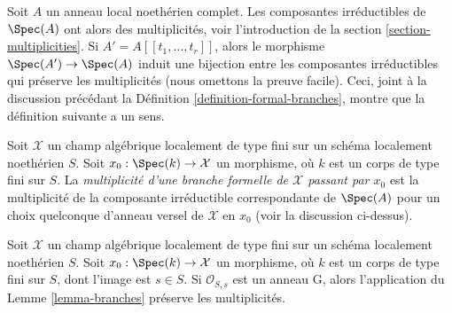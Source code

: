 \noindent
Soit $A$ un anneau local noethérien complet. Les composantes
irréductibles de $\Spec(A)$ ont alors des multiplicités, voir
l'introduction de la section \ref{section-multiplicities}.
Si $A' = A[[t_1, \ldots, t_r]]$, alors le morphisme
$\Spec(A') \to \Spec(A)$ induit une bijection entre les composantes
irréductibles qui préserve les multiplicités (nous omettons la preuve facile).
Ceci, joint à la discussion précédant la
Définition \ref{definition-formal-branches},
montre que la définition suivante a un sens.

\begin{definition}
\label{definition-multiplicity-formal-branches}
Soit $\mathcal{X}$ un champ algébrique localement de type fini
sur un schéma localement noethérien $S$. Soit $x_0 : \Spec(k) \to \mathcal{X}$
un morphisme, où $k$ est un corps de type fini sur $S$.
La {\it multiplicité d'une branche formelle de $\mathcal{X}$ passant par $x_0$}
est la multiplicité de la composante irréductible correspondante de
$\Spec(A)$ pour un choix quelconque d'anneau versel de $\mathcal{X}$ en $x_0$
(voir la discussion ci-dessus).
\end{definition}

\begin{lemma}
\label{lemma-branches-multiplicity}
Soit $\mathcal{X}$ un champ algébrique localement de type fini
sur un schéma localement noethérien $S$. Soit $x_0 : \Spec(k) \to \mathcal{X}$
un morphisme, où $k$ est un corps de type fini sur $S$, dont
l'image est $s \in S$. Si $\mathcal{O}_{S, s}$ est un anneau G, alors
l'application du Lemme \ref{lemma-branches} préserve les multiplicités.
\end{lemma}

